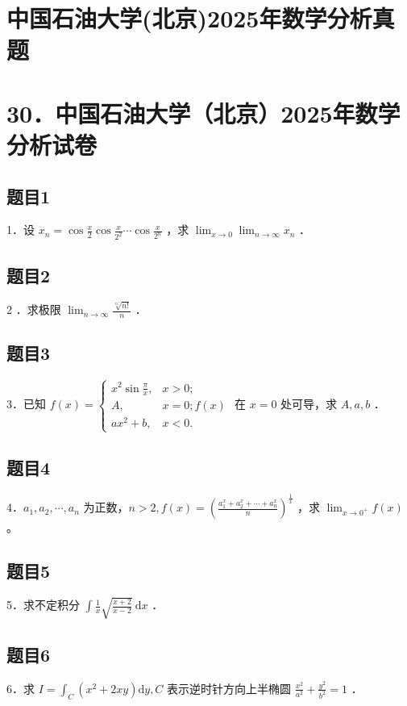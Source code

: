 \documentclass{article}
\begin{document}
\section*{中国石油大学(北京)2025年数学分析真题}
\section*{30．中国石油大学（北京）2025年数学分析试卷}

\subsection{题目1}
1．设 \(x_{n}=\cos \frac{x}{2} \cos \frac{x}{2^{2}} \cdots \cos \frac{x}{2^{n}}\) ，求 \(\lim _{x \rightarrow 0} \lim _{n \rightarrow \infty} x_{n}\) ．

\subsection{题目2}
2 ．求极限 \(\lim _{n \rightarrow \infty} \frac{\sqrt[n]{n!}}{n}\) ．

\subsection{题目3}
3．已知 \(f(x)=\left\{\begin{array}{ll}x^{2} \sin \frac{\pi}{x}, & x>0 ; \\ A, & x=0 ; f(x) \\ a x^{2}+b, & x<0 .\end{array}\right.\) 在 \(x=0\) 处可导，求 \(A, a, b\) ．

\subsection{题目4}
4．\(a_{1}, a_{2}, \cdots, a_{n}\) 为正数，\(n>2, f(x)=\left(\frac{a_{1}^{x}+a_{2}^{x}+\cdots+a_{n}^{x}}{n}\right)^{\frac{1}{x}}\) ，求 \(\lim _{x \rightarrow 0^{+}} f(x)\) 。

\subsection{题目5}
5．求不定积分 \(\int \frac{1}{x} \sqrt{\frac{x+2}{x-2}} \mathrm{~d} x\) ．

\subsection{题目6}
6．求 \(I=\int_{C}\left(x^{2}+2 x y\right) \mathrm{d} y, C\) 表示逆时针方向上半椭圆 \(\frac{x^{2}}{a^{2}}+\frac{y^{2}}{b^{2}}=1\) ．
\end{document}
